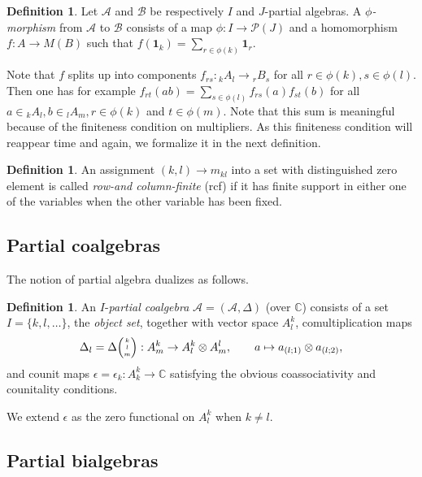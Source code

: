 \documentclass[10pt]{article}
\newcommand{\C}{\mathbb{C}}
\newcommand{\GrDA}[3]{{}_{#2}#1_{#3}} %
\newcommand{\Grtt}[4]{#1{\tiny {\begin{pmatrix} #2\\#3\\#4\end{pmatrix}}}}
\newcommand{\GrRA}[3]{#1^{#2}_{#3}} %
\newcommand{\Unit}{\mathbf{1}}
\theoremstyle{definition}
\newtheorem{Def}[Theorem]{Definition}
\numberwithin{equation}{section}
\begin{document}
\begin{Def}\label{DefMor} Let $\mathscr{A}$ and $\mathscr{B}$ be respectively $I$ and $J$-partial algebras. A \emph{$\phi$-morphism} from $\mathscr{A}$ to $\mathscr{B}$ consists of a map $\phi:I \rightarrow \mathscr{P}(J)$ and a homomorphism $f:A\rightarrow M(B)$ such that $f(\Unit_k) = \sum_{r\in \phi(k)} \Unit_r$.
\end{Def} 

Note that $f$ splits up into components $f_{rs}: \GrDA{A}{k}{l}\rightarrow \GrDA{B}{r}{s}$ for all $r\in \phi(k),s\in \phi(l)$. Then one has for example $f_{rt}(ab) = \sum_{s\in \phi(l)} f_{rs}(a)f_{st}(b)$ for all $a\in \GrDA{A}{k}{l}, b\in \GrDA{A}{l}{m}, r\in \phi(k)$ and $t\in \phi(m)$. Note that this sum is meaningful because of the finiteness condition on multipliers. As this finiteness condition will reappear time and again, we formalize it in the next definition.
 
\begin{Def} An assignment $(k,l)\rightarrow m_{kl}$ into a set with distinguished zero element is called \emph{row-and column-finite} (rcf) if it has finite support in either one of the variables when the other variable has been fixed. 
\end{Def} 

\subsection{Partial coalgebras}

The notion of partial algebra dualizes as follows.

\begin{Def}\label{DefCoAlg} An  $I$-\emph{partial coalgebra} $\mathscr{A}=(\mathscr{A},\Delta)$ (over $\C$) consists of a set $I=\{k,l,\ldots\}$, the \emph{object set}, together with vector space $\GrRA{A}{k}{l}$, comultiplication maps \[\Delta_{l} = \Grtt{\Delta}{k}{l}{m}:\GrRA{A}{k}{m}\rightarrow \GrRA{A}{k}{l}\otimes \GrRA{A}{l}{m},\qquad a \mapsto a_{(l;1)}\otimes a_{(l;2)},\] and counit maps $\epsilon =\epsilon_k:\GrRA{A}{k}{k}\rightarrow \C$ satisfying the obvious coassociativity and counitality conditions.
\end{Def}

We extend $\epsilon$ as the zero functional on $\GrRA{A}{k}{l}$ when $k\neq l$.

\subsection{Partial bialgebras}
\end{document}
